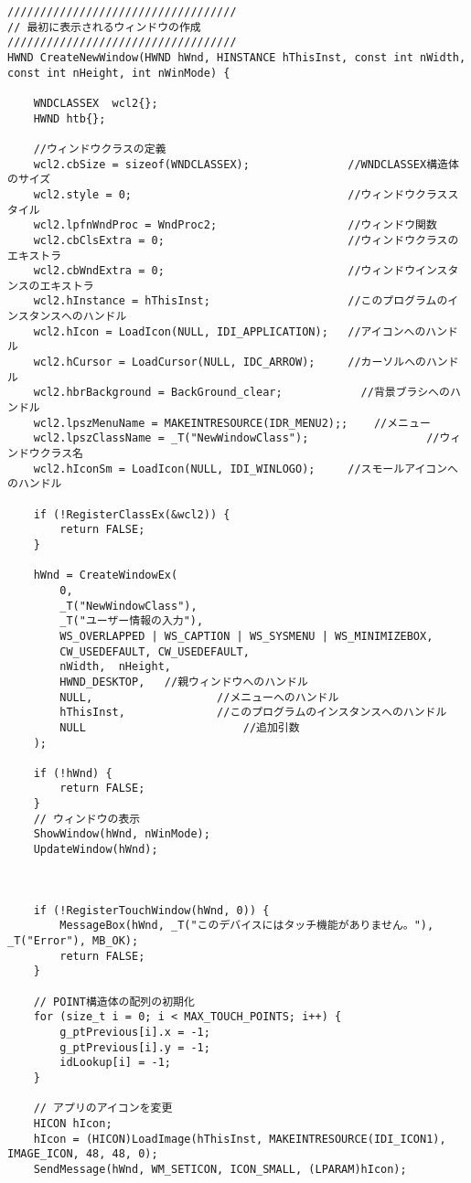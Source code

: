 \begin{lstlisting}[caption=UserInfoWindow.cpp]
///////////////////////////////////
// 最初に表示されるウィンドウの作成
///////////////////////////////////
HWND CreateNewWindow(HWND hWnd, HINSTANCE hThisInst, const int nWidth, const int nHeight, int nWinMode) {

	WNDCLASSEX	wcl2{};
	HWND htb{};

	//ウィンドウクラスの定義
	wcl2.cbSize = sizeof(WNDCLASSEX);				//WNDCLASSEX構造体のサイズ
	wcl2.style = 0;									//ウィンドウクラススタイル
	wcl2.lpfnWndProc = WndProc2;					//ウィンドウ関数
	wcl2.cbClsExtra = 0;							//ウィンドウクラスのエキストラ
	wcl2.cbWndExtra = 0;							//ウィンドウインスタンスのエキストラ
	wcl2.hInstance = hThisInst;						//このプログラムのインスタンスへのハンドル
	wcl2.hIcon = LoadIcon(NULL, IDI_APPLICATION);	//アイコンへのハンドル
	wcl2.hCursor = LoadCursor(NULL, IDC_ARROW);		//カーソルへのハンドル
	wcl2.hbrBackground = BackGround_clear;            //背景ブラシへのハンドル
	wcl2.lpszMenuName = MAKEINTRESOURCE(IDR_MENU2);;	//メニュー
	wcl2.lpszClassName = _T("NewWindowClass");					//ウィンドウクラス名
	wcl2.hIconSm = LoadIcon(NULL, IDI_WINLOGO);		//スモールアイコンへのハンドル

	if (!RegisterClassEx(&wcl2)) {
		return FALSE;
	}

	hWnd = CreateWindowEx(
		0,                                                                                            
		_T("NewWindowClass"),                                                                          
		_T("ユーザー情報の入力"),				                                                         
		WS_OVERLAPPED | WS_CAPTION | WS_SYSMENU | WS_MINIMIZEBOX,	 
		CW_USEDEFAULT, CW_USEDEFAULT,			 
		nWidth,	 nHeight,			    
		HWND_DESKTOP,	//親ウィンドウへのハンドル
		NULL,					//メニューへのハンドル
		hThisInst,				//このプログラムのインスタンスへのハンドル
		NULL					    //追加引数
	);

	if (!hWnd) {
		return FALSE;
	}
	// ウィンドウの表示
	ShowWindow(hWnd, nWinMode);
	UpdateWindow(hWnd);



	if (!RegisterTouchWindow(hWnd, 0)) {
		MessageBox(hWnd, _T("このデバイスにはタッチ機能がありません。"), _T("Error"), MB_OK);
		return FALSE;
	}

	// POINT構造体の配列の初期化
	for (size_t i = 0; i < MAX_TOUCH_POINTS; i++) {
		g_ptPrevious[i].x = -1;
		g_ptPrevious[i].y = -1;
		idLookup[i] = -1;
	}

	// アプリのアイコンを変更
	HICON hIcon;
	hIcon = (HICON)LoadImage(hThisInst, MAKEINTRESOURCE(IDI_ICON1), IMAGE_ICON, 48, 48, 0);
	SendMessage(hWnd, WM_SETICON, ICON_SMALL, (LPARAM)hIcon);


\end{lstlisting}
